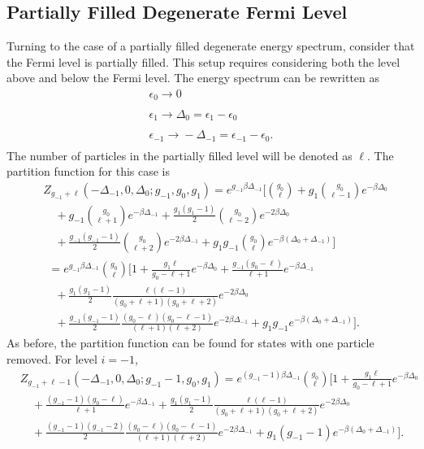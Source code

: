 \subsection{Partially Filled Degenerate Fermi Level}\label{section:partdegen}
Turning to the case of a partially filled degenerate energy spectrum, consider that the Fermi level is partially filled. This setup requires considering both the level above and below the Fermi level. The energy spectrum can be rewritten as 
\begin{gather}
    \epsilon_0 \xrightarrow[]{} 0\nonumber\\
    \epsilon_1 \xrightarrow[]{} \Delta_0=\epsilon_1-\epsilon_0\nonumber\\
    \epsilon_{-1} \xrightarrow[]{} -\Delta_{-1}=\epsilon_{-1}-\epsilon_0.\nonumber
\end{gather}
The number of particles in the partially filled level will be denoted as $\ell$. The partition function for this case is 
\begin{align}
    &Z_{g_{-1}+\ell}(-\Delta_{-1},0,\Delta_0;g_{-1},g_0,g_1) = e^{g_{-1}\beta\Delta_{-1}} \Biggr[{g_0\choose \ell}+g_1{g_0\choose \ell-1}e^{-\beta\Delta_0} \nonumber\\
    &\quad +g_{-1}{g_0\choose \ell+1}e^{-\beta\Delta_{-1}} +\frac{g_1(g_1-1)}{2} {g_0\choose \ell-2}e^{-2\beta\Delta_0}\nonumber\\ 
    &\quad +\frac{g_{-1}(g_{-1}-1)}{2} {g_0\choose \ell+2} e^{-2\beta\Delta_{-1}} +g_1g_{-1}{g_0\choose \ell} e^{-\beta(\Delta_0+\Delta_{-1})} \Biggr]\nonumber\\
    &\ \ =e^{g_{-1}\beta\Delta_{-1}} {g_0\choose \ell} \Biggr[1+ \frac{g_1 \ell}{g_0-\ell+1} e^{-\beta\Delta_0} +\frac{g_{-1}(g_0-\ell)}{\ell+1} e^{-\beta\Delta_{-1}} \nonumber\\
    &\quad+\frac{g_1(g_1-1)}{2} \frac{\ell(\ell-1)}{(g_0+\ell+1)(g_0+\ell+2)}e^{-2\beta\Delta_0} \nonumber\\
    &\quad+\frac{g_{-1}(g_{-1}-1)}{2} \frac{(g_0-\ell)(g_0-\ell-1)}{(\ell+1)(\ell+2)} e^{-2\beta\Delta_{-1}}+g_1g_{-1}e^{-\beta(\Delta_0+\Delta_{-1})}\Biggr]. \label{2.34}
\end{align}
As before, the partition function can be found for states with one particle removed. For level $i=-1$,
\begin{align}
    &Z_{g_{-1}+\ell-1}(-\Delta_{-1},0,\Delta_0;g_{-1}-1,g_0,g_1)=e^{(g_{-1}-1)\beta\Delta_{-1}} {g_0\choose \ell} \Biggr[1+\frac{g_1 \ell}{g_0-\ell+1} e^{-\beta\Delta_0} \nonumber\\
    &\quad +\frac{(g_{-1}-1)(g_0-\ell)}{\ell+1} e^{-\beta\Delta_{-1}}+\frac{g_1(g_1-1)}{2} \frac{\ell(\ell-1)}{(g_0+\ell+1)(g_0+\ell+2)}e^{-2\beta\Delta_0} \nonumber\\
    &\quad+\frac{(g_{-1}-1)(g_{-1}-2)}{2} \frac{(g_0-\ell)(g_0-\ell-1)}{(\ell+1)(\ell+2)} e^{-2\beta\Delta_{-1}}+g_1(g_{-1}-1)e^{-\beta(\Delta_0+\Delta_{-1})}\Biggr]. 
\end{align}

